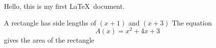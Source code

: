 \documentclass[11pt]{article}
\begin{document}
	Hello, this is my first \LaTeX\ document.
	
	A rectangle has side lengths of $\left(x+1\right)$ and $\left(x+3\right)$
	The equation \[A(x) = x^2+4x+3\] gives the area of the rectangle
\end{document}
